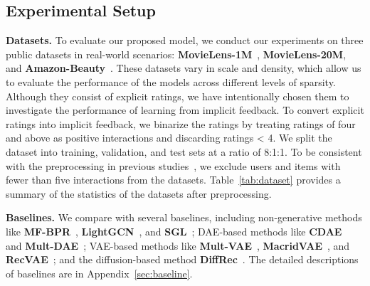 \documentclass[sigconf]{acmart}
\begin{document}
\subsection{Experimental Setup}
\noindent \textbf{Datasets.} To evaluate our proposed model, we conduct our experiments on three public datasets in real-world scenarios: \textbf{MovieLens-1M}~\cite{harper2015movielens}, \textbf{MovieLens-20M}, and \textbf{Amazon-Beauty}~\cite{mcauley2015image}. These datasets vary in scale and density, which allow us to evaluate the performance of the models across different levels of sparsity. Although they consist of explicit ratings, we have intentionally chosen them to investigate the performance of learning from implicit feedback. To convert explicit ratings into implicit feedback, we binarize the ratings by treating ratings of four and above as positive interactions and discarding ratings < 4. We split the dataset into training, validation, and test sets at a ratio of 8:1:1. To be consistent with the preprocessing in previous studies~\cite{liang2018variational}, we exclude users and items with fewer than five interactions from the datasets. Table~\ref{tab:dataset} provides a summary of the statistics of the datasets after preprocessing.

\begin{table}[ht]
\normalsize
  \centering
  \caption{Statistics of the experimented datasets.}
  \label{tab:dataset}
\end{table}

\noindent \textbf{Baselines.} We compare \ours with several baselines, including non-generative methods like \textbf{MF-BPR}~\cite{rendle2012bpr}, \textbf{LightGCN}~\cite{he2020lightgcn}, and \textbf{SGL}~\cite{wujc2021self}; DAE-based methods like \textbf{CDAE}~\cite{wu2016collaborative} and \textbf{Mult-DAE}~\cite{liang2018variational}; VAE-based methods like \textbf{Mult-VAE}~\cite{liang2018variational}, \textbf{MacridVAE}~\cite{ma2019learning}, and \textbf{RecVAE}~\cite{shenbin2020recvae}; and the diffusion-based method \textbf{DiffRec}~\cite{wang2023diffusion}. The detailed descriptions of baselines are in Appendix~\ref{sec:baseline}.
\end{document}
